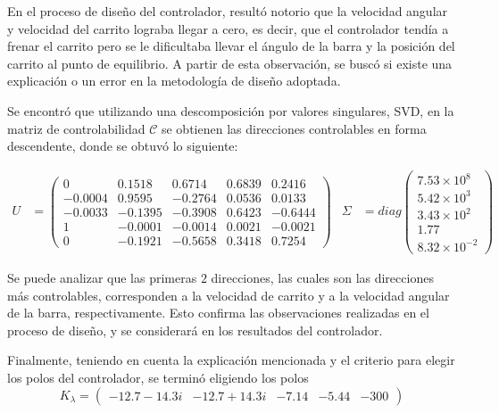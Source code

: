 \documentclass[a4paper,10pt]{article}
\begin{document}
En el proceso de diseño del controlador, resultó notorio que la velocidad angular y velocidad del carrito lograba llegar a cero, es decir, que el controlador tendía a frenar el carrito pero se le dificultaba llevar el ángulo de la barra y la posición del carrito al punto de equilibrio. A partir de esta observación, se buscó si existe una explicación o un error en la metodología de diseño adoptada. 

Se encontró que utilizando una descomposición por valores singulares, SVD, en la matriz de controlabilidad $\mathcal{C}$ se obtienen las direcciones controlables en forma descendente, donde se obtuvó lo siguiente:

\begin{align*}
    U &= \begin{pmatrix}
         0      &  0.1518 &  0.6714 & 0.6839 &  0.2416 \\
        -0.0004 &  0.9595 & -0.2764 & 0.0536 &  0.0133 \\ 
        -0.0033 & -0.1395 & -0.3908 & 0.6423 & -0.6444 \\
         1      & -0.0001 & -0.0014 & 0.0021 & -0.0021 \\
         0      & -0.1921 & -0.5658 & 0.3418 &  0.7254 
    \end{pmatrix} & 
    \Sigma &= diag\begin{pmatrix}
        7.53 \times 10^{8} \\
        5.42 \times 10^{3} \\
        3.43 \times 10^{2} \\
        1.77  \\
        8.32 \times 10^{-2}
    \end{pmatrix}
\end{align*}

Se puede analizar que las primeras $2$ direcciones, las cuales son las direcciones más controlables, corresponden a la velocidad de carrito y a la velocidad angular de la barra, respectivamente. Esto confirma las observaciones realizadas en el proceso de diseño, y se considerará en los resultados del controlador.

Finalmente, teniendo en cuenta la explicación mencionada y el criterio para elegir los polos del controlador, se terminó eligiendo los polos 
\begin{equation*}
    K_\lambda = \begin{pmatrix} -12.7-14.3i & -12.7+14.3i & -7.14 & -5.44 & -300 \end{pmatrix}
\end{equation*}
\end{document}
